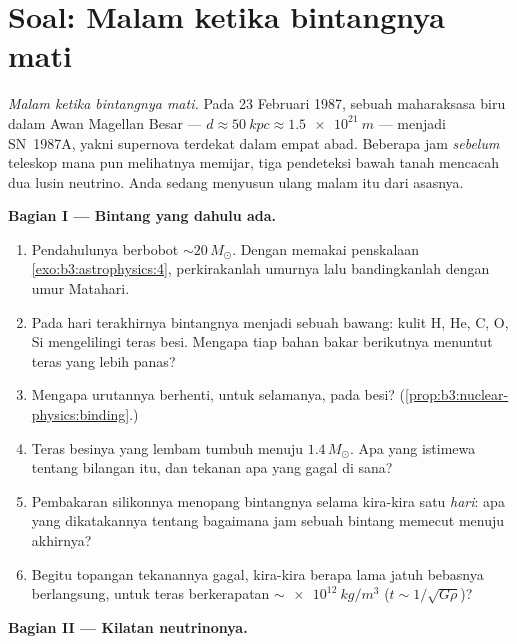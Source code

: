 \section{Soal: Malam ketika bintangnya mati}

\begin{problem}\label{pb:b3:astrophysics:1}
\emph{Malam ketika bintangnya mati.} Pada 23 Februari 1987, sebuah
maharaksasa biru dalam Awan Magellan Besar --- $d \approx
\qty{50}{kpc} \approx \qty{1.5e21}{m}$ --- menjadi SN~1987A, yakni
supernova terdekat dalam empat abad. Beberapa jam \emph{sebelum} teleskop
mana pun melihatnya memijar, tiga pendeteksi bawah tanah mencacah
dua lusin neutrino. Anda sedang menyusun ulang malam itu dari asasnya.

\medskip\noindent\textbf{Bagian I --- Bintang yang dahulu ada.}

\begin{enumerate}
  \item Pendahulunya berbobot ${\sim}20\,M_\odot$. Dengan memakai
        penskalaan \cref{exo:b3:astrophysics:4}, perkirakanlah
        umurnya lalu bandingkanlah dengan umur Matahari.
  \item Pada hari terakhirnya bintangnya menjadi sebuah bawang: kulit H, He, C, O, Si
        mengelilingi teras besi. Mengapa tiap bahan bakar
        berikutnya menuntut teras yang lebih panas?
  \item Mengapa urutannya berhenti, untuk selamanya, pada besi?
        (\cref{prop:b3:nuclear-physics:binding}.)
  \item Teras besinya yang lembam tumbuh menuju $1.4\,M_\odot$. Apa yang
        istimewa tentang bilangan itu, dan tekanan apa yang gagal
        di sana?
  \item Pembakaran silikonnya menopang bintangnya selama kira-kira satu
        \emph{hari}: apa yang dikatakannya tentang bagaimana jam sebuah bintang
        memecut menuju akhirnya?
  \item Begitu topangan tekanannya gagal, kira-kira berapa lama jatuh
        bebasnya berlangsung, untuk teras berkerapatan
        $\sim\qty{e12}{kg/m^3}$ ($t \sim 1/\sqrt{G\rho}$)?
\end{enumerate}

\medskip\noindent\textbf{Bagian II --- Kilatan neutrinonya.}


\end{problem}
